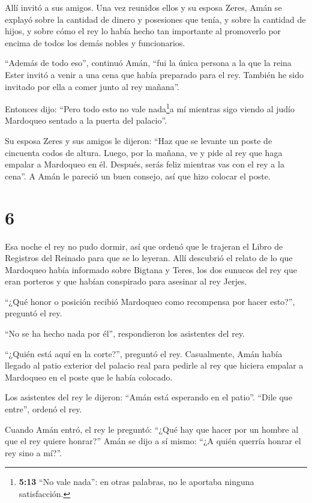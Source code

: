 Allí invitó a sus amigos. Una vez reunidos ellos y su esposa Zeres,
 Amán se explayó sobre la cantidad de dinero y posesiones
que tenía, y sobre la cantidad de hijos, y sobre cómo el rey lo había
hecho tan importante al promoverlo por encima de todos los demás nobles
y funcionarios.

 ``Además de todo eso'', continuó Amán, ``fui la única
persona a la que la reina Ester invitó a venir a una cena que había
preparado para el rey. También he sido invitado por ella a comer junto
al rey mañana''.

 Entonces dijo: ``Pero todo esto no vale nada\footnote{\textbf{5:13}
  ``No vale nada'': en otras palabras, no le aportaba ninguna
  satisfacción.}a mí mientras sigo viendo al judío Mardoqueo sentado a
la puerta del palacio''.

 Su esposa Zeres y sus amigos le dijeron: ``Haz que se
levante un poste de cincuenta codos de altura. Luego, por la mañana, ve
y pide al rey que haga empalar a Mardoqueo en él. Después, serás feliz
mientras vas con el rey a la cena''. A Amán le pareció un buen consejo,
así que hizo colocar el poste.

\hypertarget{section-5}{%
\section{6}\label{section-5}}

 Esa noche el rey no pudo dormir, así que ordenó que le
trajeran el Libro de Registros del Reinado para que se lo leyeran.
 Allí descubrió el relato de lo que Mardoqueo había
informado sobre Bigtana y Teres, los dos eunucos del rey que eran
porteros y que habían conspirado para asesinar al rey Jerjes.

 ``¿Qué honor o posición recibió Mardoqueo como recompensa
por hacer esto?'', preguntó el rey.

``No se ha hecho nada por él'', respondieron los asistentes del rey.

 ``¿Quién está aquí en la corte?'', preguntó el rey.
Casualmente, Amán había llegado al patio exterior del palacio real para
pedirle al rey que hiciera empalar a Mardoqueo en el poste que le había
colocado.

 Los asistentes del rey le dijeron: ``Amán está esperando en
el patio''. ``Dile que entre'', ordenó el rey.

 Cuando Amán entró, el rey le preguntó: ``¿Qué hay que hacer
por un hombre al que el rey quiere honrar?'' Amán se dijo a sí mismo:
``¿A quién querría honrar el rey sino a mí?''.

